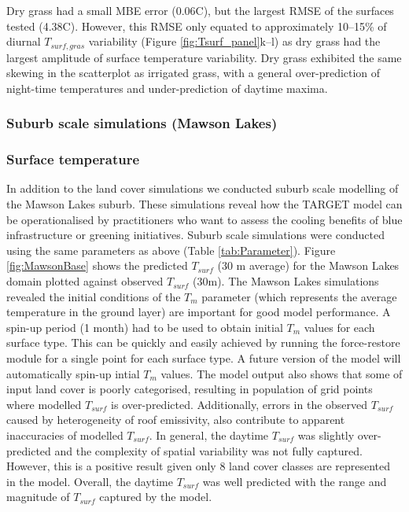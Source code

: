 \documentclass[journal abbreviation, manuscript]{copernicus}
\begin{document}
Dry grass had a small MBE error (0.06\degree C), but the largest RMSE of the surfaces tested (4.38\degree C). However, this RMSE only equated to approximately 10--15\% of diurnal $T_{surf,gras}$ variability (Figure \ref{fig:Tsurf_panel}k--l) as dry grass had the largest amplitude of surface temperature variability. Dry grass exhibited the same skewing in the scatterplot as irrigated grass, with a general over-prediction of night-time temperatures and under-prediction of daytime maxima. 





\subsubsection{Suburb scale simulations (Mawson Lakes)}\label{sec:suburbresult} 
\subsubsection*{Surface temperature}\label{sec:surftempresult} 



In addition to the land cover simulations we conducted suburb scale modelling of the Mawson Lakes suburb. These simulations reveal how the TARGET model can be operationalised by practitioners who want to assess the cooling benefits of blue infrastructure or greening initiatives. Suburb scale simulations were conducted using the same parameters as above (Table \ref{tab:Parameter}). Figure \ref{fig:MawsonBase} shows the predicted $T_{surf}$ (30 m average) for the Mawson Lakes domain plotted against observed $T_{surf}$ (30m). The Mawson Lakes simulations revealed the initial conditions of the \ensuremath{T_{m}} parameter (which represents the average temperature in the ground layer) are  important for good model performance. A spin-up period (1 month) had to be used to obtain initial \ensuremath{T_{m}} values for each surface type. This can be quickly and easily achieved by running the force-restore module for a single point for each surface type. A future version of the model will automatically spin-up intial \ensuremath{T_{m}} values. The model output also shows that some of input land cover is poorly categorised, resulting in population of grid points where modelled $T_{surf}$ is  over-predicted. Additionally, errors in the observed $T_{surf}$ caused by heterogeneity of roof emissivity,  also contribute to apparent inaccuracies of modelled $T_{surf}$. In general, the daytime $T_{surf}$ was slightly over-predicted and the complexity of spatial variability was not fully captured. However, this is a positive result given only 8 land cover classes are represented in the model. Overall, the daytime $T_{surf}$ was well predicted with the range and magnitude of $T_{surf}$ captured by the model. 
\end{document}
